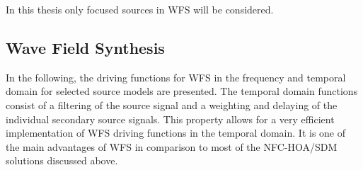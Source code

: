 In this thesis only focused sources in \ac{WFS} will be considered.


\subsection{Wave Field Synthesis}
\label{sec:driving_functions_wfs}

In the following, the driving functions for \ac{WFS} in the frequency and
temporal domain
for selected source models are presented. The temporal domain
functions consist of a filtering of the source signal and a weighting and
delaying of the individual secondary source signals. This property allows for a very efficient
implementation of \ac{WFS} driving functions in the temporal domain.
It is one of the main advantages of \ac{WFS} in comparison
to most of the \ac{NFC-HOA}/\ac{SDM} solutions discussed above.

